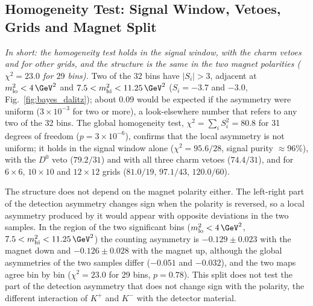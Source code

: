 \subsection{Homogeneity Test: Signal Window, Vetoes, Grids and Magnet Split}
\emph{In short: the homogeneity test holds in the signal window, with the charm vetoes and for other grids, and the structure is the same in the two magnet polarities ($\chi^2=23.0$ for $29$ bins).}
Two of the 32 bins have $|S_i|>3$, adjacent at $m^2_{\mathrm{lo}}<4\,\GeV^2$ and $7.5<m^2_{\mathrm{hi}}<11.25\,\GeV^2$ ($S_i=-3.7$ and $-3.0$, Fig.~\ref{fig:bayes_dalitz}); about $0.09$ would be expected if the asymmetry were uniform ($3\times10^{-3}$ for two or more), a look-elsewhere number that refers to any two of the 32 bins. The global homogeneity test, $\chi^2=\sum_iS_i^2=80.8$ for 31 degrees of freedom ($p=3\times10^{-6}$), confirms that the local asymmetry is not uniform; it holds in the signal window alone ($\chi^2=95.6/28$, signal purity $\approx$96\%), with the $D^0$ veto ($79.2/31$) and with all three charm vetoes ($74.4/31$), and for $6\times6$, $10\times10$ and $12\times12$ grids ($81.0/19$, $97.1/43$, $120.0/60$).

The structure does not depend on the magnet polarity either. The left-right part of the detection asymmetry changes sign when the polarity is reversed, so a local asymmetry produced by it would appear with opposite deviations in the two samples. In the region of the two significant bins ($m^2_{\mathrm{lo}}<4\,\GeV^2$, $7.5<m^2_{\mathrm{hi}}<11.25\,\GeV^2$) the counting asymmetry is $-0.129\pm0.023$ with the magnet down and $-0.126\pm0.028$ with the magnet up, although the global asymmetries of the two samples differ ($-0.051$ and $-0.032$), and the two maps agree bin by bin ($\chi^2=23.0$ for 29 bins, $p=0.78$). This split does not test the part of the detection asymmetry that does not change sign with the polarity, the different interaction of $K^+$ and $K^-$ with the detector material.

